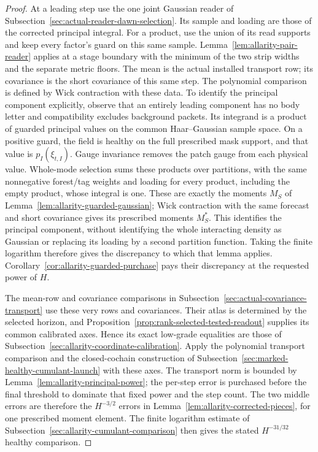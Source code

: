 \begin{proof}
At a leading step use the one joint Gaussian reader of
Subsection~\ref{sec:actual-reader-dawn-selection}. Its sample and loading
are those of the corrected principal integral. For a product, use the
union of its read supports and keep every factor's guard on this same
sample. Lemma~\ref{lem:allarity-pair-reader} applies at a stage boundary
with the minimum of the two strip widths and the separate metric
floors. The mean is the actual installed transport row; its covariance
is the short covariance of this same step. The polynomial comparison
is defined by Wick contraction with these data. To identify the principal component explicitly, observe that an
entirely leading component has no body letter and compatibility excludes
background packets. Its integrand is a product of guarded principal
values on the common Haar--Gaussian sample space. On a positive guard,
the field is healthy on the full prescribed mask support, and that value
is $p_I(\xi_{t,I})$. Gauge invariance removes the patch gauge from each
physical value. Whole-mode selection sums these products over partitions,
with the same nonnegative forest/tag weights and loading for every
product, including the empty product, whose integral is one. These are
exactly the moments $M_S$ of
Lemma~\ref{lem:allarity-guarded-gaussian}; Wick contraction with the
same forecast and short covariance gives its prescribed moments
$M_S^*$. This identifies the principal component, without identifying the
whole interacting density as Gaussian or replacing its loading by a
second partition function. Taking the finite logarithm therefore gives
the discrepancy to which that lemma applies. Corollary~\ref{cor:allarity-guarded-purchase}
pays their discrepancy at the requested power of $H$.

The mean-row and covariance comparisons in
Subsection~\ref{sec:actual-covariance-transport} use these very rows and
covariances. Their atlas is determined by the selected horizon, and
Proposition~\ref{prop:rank-selected-tested-readout} supplies its common
calibrated axes. Hence its exact low-grade equalities are those of
Subsection~\ref{sec:allarity-coordinate-calibration}. Apply the polynomial
transport comparison and the closed-cochain construction of
Subsection~\ref{sec:marked-healthy-cumulant-launch} with these axes.
The transport norm is bounded by Lemma~\ref{lem:allarity-principal-power};
the per-step error is purchased before the final threshold to dominate
that fixed power and the step count. The two middle errors are therefore
the $H^{-3/2}$ errors in Lemma~\ref{lem:allarity-corrected-pieces}, for
one prescribed moment element. The finite logarithm estimate of
Subsection~\ref{sec:allarity-cumulant-comparison} then gives the stated
$H^{-31/32}$ healthy comparison.


\end{proof}
